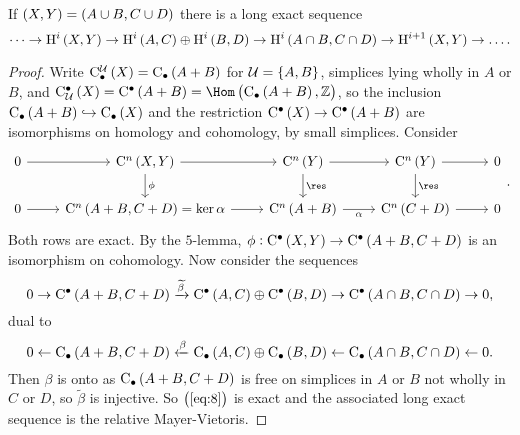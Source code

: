 \begin{lemma}
If $ \br{X, Y} = \br{A \cup B, C \cup D} $ there is a long exact sequence
$$ \dots \to \H^i\br{X, Y} \to \H^i\br{A, C} \oplus \H^i\br{B, D} \to \H^i\br{A \cap B, C \cap D} \to \H^{i + 1}\br{X, Y} \to \dots. $$
\end{lemma}

\begin{proof}
Write $ \C_\bullet^\UUU\br{X} = \C_\bullet\br{A + B} $ for $ \UUU = \cbr{A, B} $, simplices lying wholly in $ A $ or $ B $, and $ \C_\UUU^\bullet\br{X} = \C^\bullet\br{A + B} = \Hom\br{\C_\bullet\br{A + B}, \ZZ} $, so the inclusion $ \C_\bullet\br{A + B} \hookrightarrow \C_\bullet\br{X} $ and the restriction $ \C^\bullet\br{X} \to \C^\bullet\br{A + B} $ are isomorphisms on homology and cohomology, by small simplices. Consider
$$
\begin{tikzcd}
0 \arrow{r} & \C^n\br{X, Y} \arrow{r} \arrow{d}{\phi} & \C^n\br{Y} \arrow{r} \arrow{d}{\res} & \C^n\br{Y} \arrow{r} \arrow{d}{\res} & 0 \\
0 \arrow{r} & \C^n\br{A + B, C + D} = \ker \alpha \arrow{r} & \C^n\br{A + B} \arrow{r}[swap]{\alpha} & \C^n\br{C + D} \arrow{r} & 0
\end{tikzcd}.
$$
Both rows are exact. By the $ 5 $-lemma, $ \phi : \C^\bullet\br{X, Y} \to \C^\bullet\br{A + B, C + D} $ is an isomorphism on cohomology. Now consider the sequences
\begin{equation}
\label{eq:8}
0 \to \C^\bullet\br{A + B, C + D} \xrightarrow{\widetilde{\beta}} \C^\bullet\br{A, C} \oplus \C^\bullet\br{B, D} \to \C^\bullet\br{A \cap B, C \cap D} \to 0,
\end{equation}
dual to
$$ 0 \gets \C_\bullet\br{A + B, C + D} \xleftarrow{\beta} \C_\bullet\br{A, C} \oplus \C_\bullet\br{B, D} \gets \C_\bullet\br{A \cap B, C \cap D} \gets 0. $$
Then $ \beta $ is onto as $ \C_\bullet\br{A + B, C + D} $ is free on simplices in $ A $ or $ B $ not wholly in $ C $ or $ D $, so $ \widetilde{\beta} $ is injective. So $ \br{\ref{eq:8}} $ is exact and the associated long exact sequence is the relative Mayer-Vietoris.
\end{proof}

\pagebreak

